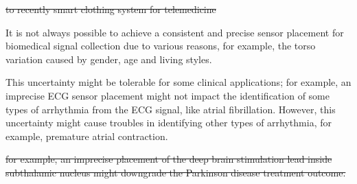 {\st{to recently smart clothing system for telemedicine}
\cite{nesenbergs2016architecture} 

It is not always possible to achieve a consistent and precise sensor
placement for biomedical signal collection due to various reasons, for example, the torso variation caused by gender, age and living styles.

This uncertainty might be tolerable for some clinical applications;
for example, an imprecise ECG sensor placement might not impact the
identification of some types of arrhythmia from the ECG signal, like
atrial fibrillation. However, this uncertainty might cause troubles in
identifying other types of arrhythmia, for example, premature atrial contraction.


\st{for example, an imprecise placement of the deep brain stimulation
      lead inside subthalamic nucleus might downgrade the Parkinson
      disease treatment outcome.}


}
